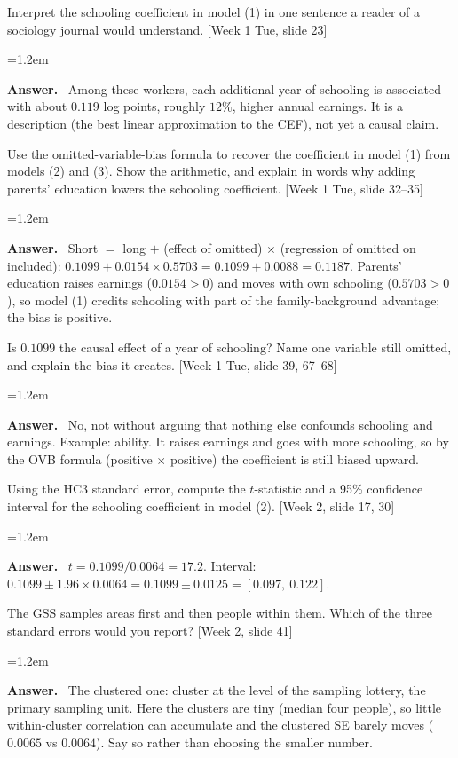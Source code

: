 \documentclass[11pt]{article}
\newenvironment{answer}{\par\smallskip
  \begin{list}{}{\leftmargin=1.2em\rightmargin=0pt}\item[]\color{dukeblue}%
  \textbf{Answer.}\ }{\end{list}\smallskip}
\newcommand{\slideref}[2]{{\footnotesize\color{gray}[Week #1, slide #2]}}
\begin{document}
\begin{enumerate}[label=(\alph*),leftmargin=*,itemsep=6pt]
\item Interpret the schooling coefficient in model (1) in one sentence a reader of a
      sociology journal would understand. \slideref{1 Tue}{23}
\begin{answer}
Among these workers, each additional year of schooling is associated with about $0.119$ log
points, roughly $12\%$, higher annual earnings. It is a description (the best linear
approximation to the CEF), not yet a causal claim.
\end{answer}

\item Use the omitted-variable-bias formula to recover the coefficient in model (1) from
      models (2) and (3). Show the arithmetic, and explain in words why adding parents'
      education lowers the schooling coefficient. \slideref{1 Tue}{32--35}
\begin{answer}
Short $=$ long $+$ (effect of omitted) $\times$ (regression of omitted on included):
$0.1099 + 0.0154 \times 0.5703 = 0.1099 + 0.0088 = 0.1187$. Parents' education raises
earnings ($0.0154 > 0$) and moves with own schooling ($0.5703 > 0$), so model (1) credits
schooling with part of the family-background advantage; the bias is positive.
\end{answer}

\item Is $0.1099$ the causal effect of a year of schooling? Name one variable still omitted, and explain the bias it creates.
      \slideref{1 Tue}{39, 67--68}
\begin{answer}
No, not without arguing that nothing else confounds schooling and earnings. Example:
ability. It raises earnings and goes with more schooling, so by the OVB formula (positive
$\times$ positive) the coefficient is still biased upward.
\end{answer}

\item Using the HC3 standard error, compute the $t$-statistic and a 95\% confidence
      interval for the schooling coefficient in model (2). \slideref{2}{17, 30}
\begin{answer}
$t = 0.1099/0.0064 = 17.2$. Interval: $0.1099 \pm 1.96 \times 0.0064 = 0.1099 \pm 0.0125
= [0.097,\ 0.122]$.
\end{answer}

\item The GSS samples areas first and then people within them. Which of the three
      standard errors would you report? \slideref{2}{41}
\begin{answer}
The clustered one: cluster at the level of the sampling lottery, the primary sampling unit.
Here the clusters are tiny (median four people), so little within-cluster correlation can
accumulate and the clustered SE barely moves ($0.0065$ vs $0.0064$). Say so rather than
choosing the smaller number.
\end{answer}


\end{enumerate}
\end{document}
